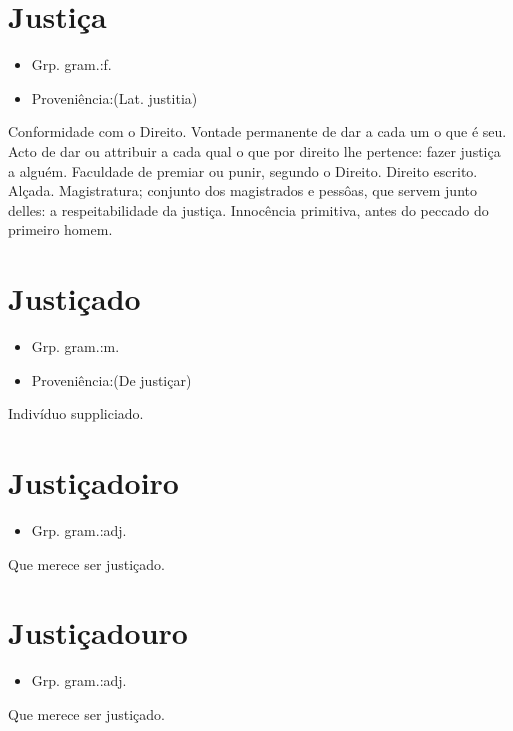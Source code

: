 \documentclass{article}
\begin{document}
\section{Justiça}
\begin{itemize}
\item {Grp. gram.:f.}
\end{itemize}
\begin{itemize}
\item {Proveniência:(Lat. \textunderscore justitia\textunderscore )}
\end{itemize}
Conformidade com o Direito.
Vontade permanente de dar a cada um o que é seu.
Acto de dar ou attribuir a cada qual o que por direito lhe pertence: \textunderscore fazer justiça a alguém\textunderscore .
Faculdade de premiar ou punir, segundo o Direito.
Direito escrito.
Alçada.
Magistratura; conjunto dos magistrados e pessôas, que servem junto delles: \textunderscore a respeitabilidade da justiça\textunderscore .
Innocência primitiva, antes do peccado do primeiro homem.
\section{Justiçado}
\begin{itemize}
\item {Grp. gram.:m.}
\end{itemize}
\begin{itemize}
\item {Proveniência:(De \textunderscore justiçar\textunderscore )}
\end{itemize}
Indivíduo suppliciado.
\section{Justiçadoiro}
\begin{itemize}
\item {Grp. gram.:adj.}
\end{itemize}
Que merece ser justiçado.
\section{Justiçadouro}
\begin{itemize}
\item {Grp. gram.:adj.}
\end{itemize}
Que merece ser justiçado.
\end{document}
